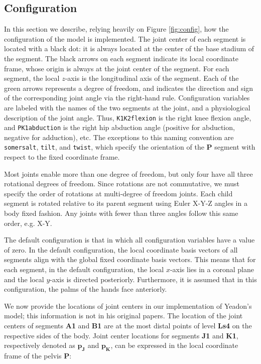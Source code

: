 \documentclass[10pt,a4paper,twocolumn]{article}
\begin{document}
\subsection*{Configuration}

In this section we describe, relying heavily on Figure \ref{fig:config}, how
the configuration of the model is implemented. The joint center of each
segment is located with a black dot: it is always located at the center of the
base stadium of the segment. The black arrows on each segment indicate its
local coordinate frame, whose origin is always at the joint center of the
segment. For each segment, the local $z$-axis is the longitudinal axis of the
segment. Each of the green arrows represents a degree of freedom, and indicates the
direction and sign of the corresponding joint angle via the right-hand rule.
Configuration variables are labeled with the names of the two segments at
the joint, and a physiological description of the joint angle. Thus,
\verb+K1K2flexion+ is the right knee flexion angle, and \verb+PK1abduction+ is
the right hip abduction angle (positive for abduction, negative for adduction),
etc. The exceptions to this naming convention are \verb+somersalt+,
\verb+tilt+, and \verb+twist+, which specify the orientation of the \textbf{P}
segment with respect to the fixed coordinate frame.

Most joints enable more than one degree of freedom, but only four have all
three rotational degrees of freedom. Since rotations are not commutative,  we must specify the order of rotations at multi-degree of freedom
joints. Each child segment is rotated relative to its parent segment using
Euler X-Y-Z angles in a body fixed fashion. Any joints with fewer than three angles follow
this same order, e.g. X-Y. 

The default configuration is that in which all configuration variables have a
value of zero. In the default configuration, the local coordinate basis vectors
of all segments align with the global fixed coordinate basis vectors. This means that
for each segment, in the default configuration, the local $x$-axis lies in a
coronal plane and the local $y$-axis is directed posteriorly. Furthermore, it
is assumed that in this configuration, the palms of the hands face anteriorly.

We now provide the locations of joint centers in our implementation of
Yeadon's model; this information is not in his original papers. The location of the joint centers of segments \textbf{A1} and
\textbf{B1} are at the most distal points of level \textbf{Ls4} on the
respective sides of the body. Joint center locations
for segments \textbf{J1} and \textbf{K1}, respectively denoted as
$\mathbf{p_J}$ and $\mathbf{p_K}$, can be expressed in the local coordinate frame of the pelvis
\textbf{P}:
\end{document}
